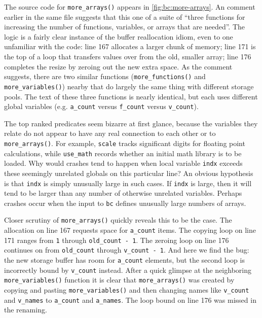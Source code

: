 The source code for \texttt{more\_arrays()} appears in
\autoref{fig:bc:more-arrays}.  An comment earlier in the same file
suggests that this one of a suite of ``three functions for increasing
the number of functions, variables, or arrays that are needed''.  The
logic is a fairly clear instance of the buffer reallocation idiom,
even to one unfamiliar with the code: line 167 allocates a larger
chunk of memory; line 171 is the top of a loop that transfers values
over from the old, smaller array; line 176 completes the resize by
zeroing out the new extra space.  As the comment suggests, there are
two similar functions (\texttt{more\_functions()} and
\texttt{more\_variables()}) nearby that do largely the same thing with
different storage pools.  The text of these three functions is nearly
identical, but each uses different global variables (e.g.
\texttt{a\_count} versus \texttt{f\_count} versus \texttt{v\_count}).

The top ranked predicates seem bizarre at first glance, because the
variables they relate do not appear to have any real connection to
each other or to \texttt{more\_arrays()}.  For example, \texttt{scale}
tracks significant digits for floating point calculations, while
\texttt{use\_math} records whether an initial math library is to be
loaded.  Why would crashes tend to happen when local variable
\texttt{indx} exceeds these seemingly unrelated globals on this
particular line?  An obvious hypothesis is that \texttt{indx} is
simply unusually large in such cases.  If \texttt{indx} is large, then
it will tend to be larger than any number of otherwise unrelated
variables.  Perhaps crashes occur when the input to \texttt{bc}
defines unusually large numbers of arrays.

Closer scrutiny of \texttt{more\_arrays()} quickly reveals this to be
the case.  The allocation on line 167 requests space for
\texttt{a\_count} items.  The copying loop on line 171 ranges from
\texttt{1} through \texttt{old\_count - 1}.  The zeroing loop on line
176 continues on from \texttt{old\_count} through \texttt{v\_count -
  1}.  And here we find the bug: the new storage buffer has room for
\texttt{a\_count} elements, but the second loop is incorrectly bound
by \texttt{v\_count} instead.  After a quick glimpse at the
neighboring \texttt{more\_variables()} function it is clear that
\texttt{more\_arrays()} was created by copying and pasting
\texttt{more\_variables()} and then changing names like
\texttt{v\_count} and \texttt{v\_names} to \texttt{a\_count} and
\texttt{a\_names}.  The loop bound on line 176 was missed in the
renaming.

